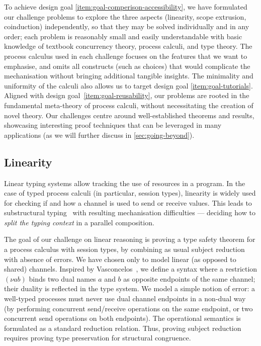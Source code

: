 \documentclass[runningheads]{llncs}
\begin{document}
To achieve design goal \ref{item:goal-comperison-accessibility}, we have
formulated our challenge problems to explore the three aspects
(linearity, scope extrusion, coinduction) independently, so that they
may be solved individually and in any order; each problem is
reasonably small and easily understandable with basic knowledge of
textbook concurrency theory, process calculi, and type theory.  The
process calculus used in each challenge focuses on the features that
we want to emphasise, and omits all constructs (such as choices) that
would complicate the mechanisation without bringing additional
tangible insights.  The minimality and uniformity of the
calculi also allows us to target design goal
\ref{item:goal-tutorials}.
Aligned with design goal~\ref{item:goal-reusability}, our problems are rooted in the fundamental meta-theory of process calculi, without necessitating the creation of novel theory.
Our challenges centre around well-established theorems and results, showcasing interesting proof techniques that can be leveraged in many applications (as we will further discuss in \cref{sec:going-beyond}).

\subsection{Linearity}
Linear typing systems allow  tracking the use of resources in a program. In
the case of typed process calculi (in particular, session types), linearity is
widely used for checking if and how a channel is used to send or receive values.
This leads to substructural typing~\cite[Chapter 1]{Pierce2004-oq} with
resulting mechanisation difficulties --- \eg deciding how to \emph{split the
typing context} in a parallel composition.

The goal of our challenge on linear reasoning is proving a type safety theorem
for a process calculus with session types, by combining as usual subject
reduction with absence of errors.  We have chosen  only to model linear (as
opposed to shared) channels. Inspired by Vasconcelos~\cite{Vasconcelos2012}, we
define a syntax where a restriction $(\nu ab)$ binds two dual names $a$
and $b$ as opposite endpoints of the same channel; their duality is
reflected in the type system. We model a simple notion of error: a well-typed
processes must never use dual channel endpoints in a non-dual way (\eg by
performing concurrent send/receive operations on the same endpoint, or two
concurrent send operations on both endpoints).
The operational semantics is formulated as a standard reduction relation. Thus,
proving subject reduction requires proving type preservation for structural
congruence.
\end{document}
